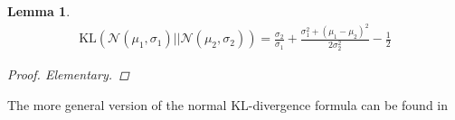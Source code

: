 \documentclass[10pt,a4paper]{article}
\newtheorem{lemma}{Lemma}
\begin{document}
\begin{lemma}
\begin{align*}
\text{KL}(\mathcal N(\mu_1,\sigma_1) || \mathcal N(\mu_2, \sigma_2)) = \frac {\sigma_2}{\sigma_1} + \frac{ \sigma_1^2 + (\mu_1-\mu_2)^2} {2\sigma_2^2}  -\frac 12 
\end{align*}
\begin{proof} Elementary. \end{proof}
\end{lemma}
\noindent The more general version of the normal KL-divergence formula can be found in \cite[Eq.~(1)]{dziugaite2017computing}



\end{document}
